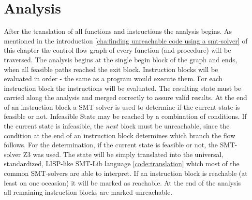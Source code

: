 \section{Analysis}
\label{sec:analysis}
After the translation of all functions and instructions the analysis begins. As mentioned in the introduction \ref{cha:finding unreachable code using a smt-solver} of this chapter the control flow graph of every function (and procedure) will be traversed. The analysis begins at the single begin block of the graph and ends, when all feasible paths reached the exit block. Instruction blocks will be evaluated in order - the same as a program would execute them. 
For each instruction block the instructions will be evaluated. The resulting state must be carried along the analysis and merged correctly to assure valid results. At the end of an instruction block a SMT-solver is used to determine if the current state is feasible or not. Infeasible State may be reached by a combination of conditions. If the current state is infeasible, the \emph{next} block must be unreachable, since the condition at the end of an instruction block determines which branch the flow follows. 
For the determination, if the current state is feasible or not, the SMT-solver Z3\cite{demouraZ3EfficientSMT2008} was used. The state will be simply translated into the universal, standardized, LISP-like SMT-Lib language \ref{code:translation} which most of the common SMT-solvers are able to interpret. 
If an instruction block is reachable (at least on one occasion) it will be marked as reachable. At the end of the analysis all remaining instruction blocks are marked unreachable.


